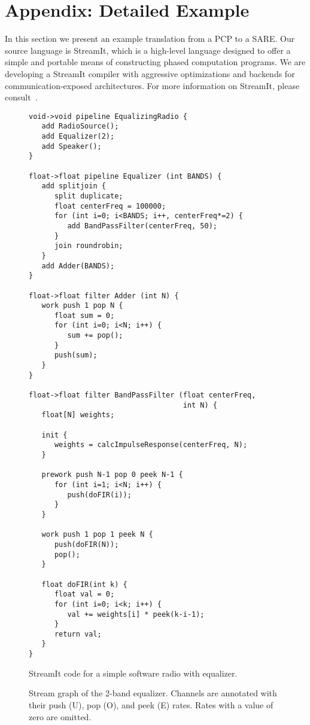 \section{Appendix: Detailed Example}

In this section we present an example translation from a PCP to a
SARE.  Our source language is StreamIt, which is a high-level language
designed to offer a simple and portable means of constructing phased
computation programs.  We are developing a StreamIt compiler with
aggressive optimizations and backends for communication-exposed
architectures.  For more information on StreamIt, please
consult~\cite{streamitcc,Gordo02}.

\begin{figure}[t]
\scriptsize
\begin{minipage}{3in}
\begin{verbatim}
void->void pipeline EqualizingRadio {
   add RadioSource();
   add Equalizer(2);
   add Speaker();
}

float->float pipeline Equalizer (int BANDS) {
   add splitjoin {
      split duplicate;
      float centerFreq = 100000;
      for (int i=0; i<BANDS; i++, centerFreq*=2) {
         add BandPassFilter(centerFreq, 50);
      }
      join roundrobin;
   }
   add Adder(BANDS);
}

float->float filter Adder (int N) {
   work push 1 pop N {
      float sum = 0;
      for (int i=0; i<N; i++) {
         sum += pop();
      }
      push(sum);
   }
}

float->float filter BandPassFilter (float centerFreq, 
                                    int N) {
   float[N] weights;

   init {
      weights = calcImpulseResponse(centerFreq, N);
   }

   prework push N-1 pop 0 peek N-1 {
      for (int i=1; i<N; i++) {
         push(doFIR(i));
      }
   }

   work push 1 pop 1 peek N {
      push(doFIR(N));
      pop();
   }

   float doFIR(int k) {
      float val = 0;
      for (int i=0; i<k; i++) {
         val += weights[i] * peek(k-i-1);
      }
      return val;
   }
}
\end{verbatim}
\vspace{-6pt}
\parbox{2.7in}{\caption{StreamIt code for a simple software radio with equalizer.
\protect\label{fig:eq-code}}}
\end{minipage}
\hspace{0.3in}
\begin{minipage}{3.2in}
\vspace{12pt}
\caption{Stream graph of the 2-band equalizer.  Channels are annotated
with their push (U), pop (O), and peek (E) rates.  Rates with a value
of zero are omitted. \protect\label{fig:eq-graph}}
\end{minipage}
\end{figure}

